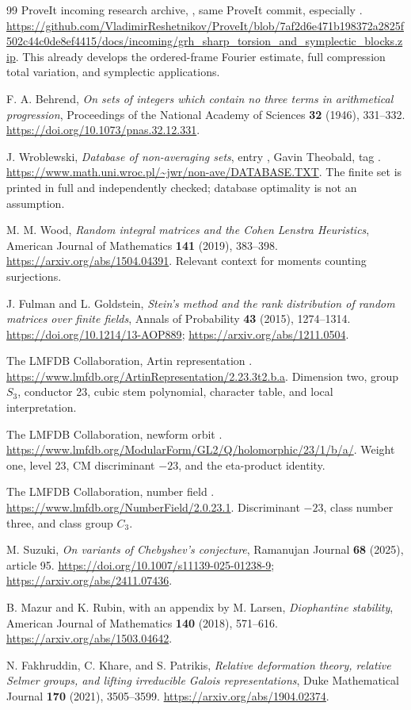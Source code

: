\begin{thebibliography}{99}
ProveIt incoming research archive,
, same ProveIt commit,
especially .
\url{https://github.com/VladimirReshetnikov/ProveIt/blob/7af2d6e471b198372a2825f502c44c0de8ef4415/docs/incoming/grh_sharp_torsion_and_symplectic_blocks.zip}.
This already develops the ordered-frame Fourier estimate, full compression
total variation, and symplectic applications.

F. A. Behrend, \emph{On sets of integers which contain no three terms in
arithmetical progression}, Proceedings of the National Academy of Sciences
\textbf{32} (1946), 331--332.
\url{https://doi.org/10.1073/pnas.32.12.331}.

J. Wroblewski, \emph{Database of non-averaging sets}, entry
, Gavin Theobald, tag .
\url{https://www.math.uni.wroc.pl/~jwr/non-ave/DATABASE.TXT}.
The finite set is printed in full and independently checked; database
optimality is not an assumption.

M. M. Wood, \emph{Random integral matrices and the Cohen Lenstra
Heuristics}, American Journal of Mathematics \textbf{141} (2019), 383--398.
\url{https://arxiv.org/abs/1504.04391}.
Relevant context for moments counting surjections.

J. Fulman and L. Goldstein, \emph{Stein's method and the rank distribution
of random matrices over finite fields}, Annals of Probability
\textbf{43} (2015), 1274--1314.
\url{https://doi.org/10.1214/13-AOP889};
\url{https://arxiv.org/abs/1211.0504}.

The LMFDB Collaboration, Artin representation .
\url{https://www.lmfdb.org/ArtinRepresentation/2.23.3t2.b.a}.
Dimension two, group \(S_3\), conductor 23, cubic stem polynomial,
character table, and local interpretation.

The LMFDB Collaboration, newform orbit .
\url{https://www.lmfdb.org/ModularForm/GL2/Q/holomorphic/23/1/b/a/}.
Weight one, level 23, CM discriminant \(-23\), and the eta-product identity.

The LMFDB Collaboration, number field .
\url{https://www.lmfdb.org/NumberField/2.0.23.1}.
Discriminant \(-23\), class number three, and class group \(C_3\).

M. Suzuki, \emph{On variants of Chebyshev's conjecture}, Ramanujan Journal
\textbf{68} (2025), article 95.
\url{https://doi.org/10.1007/s11139-025-01238-9};
\url{https://arxiv.org/abs/2411.07436}.

B. Mazur and K. Rubin, with an appendix by M. Larsen,
\emph{Diophantine stability}, American Journal of Mathematics
\textbf{140} (2018), 571--616.
\url{https://arxiv.org/abs/1503.04642}.

N. Fakhruddin, C. Khare, and S. Patrikis,
\emph{Relative deformation theory, relative Selmer groups, and lifting
irreducible Galois representations}, Duke Mathematical Journal
\textbf{170} (2021), 3505--3599.
\url{https://arxiv.org/abs/1904.02374}.
\end{thebibliography}
